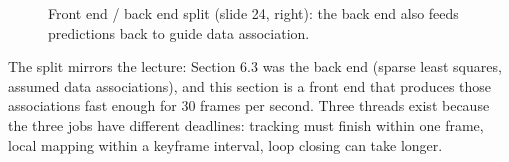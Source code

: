 \documentclass[11pt,a4paper]{article}
\begin{document}
\begin{figure}[htbp]\centering
{}
\caption{Front end / back end split (slide 24, right): the back end also feeds predictions back to guide data association.}
\end{figure}
\begin{intuition}
The split mirrors the lecture: Section 6.3 was the back end (sparse least squares, assumed data associations), and this section is a front end that produces those associations fast enough for 30 frames per second. Three threads exist because the three jobs have different deadlines: tracking must finish within one frame, local mapping within a keyframe interval, loop closing can take longer.
\end{intuition}
\end{document}
